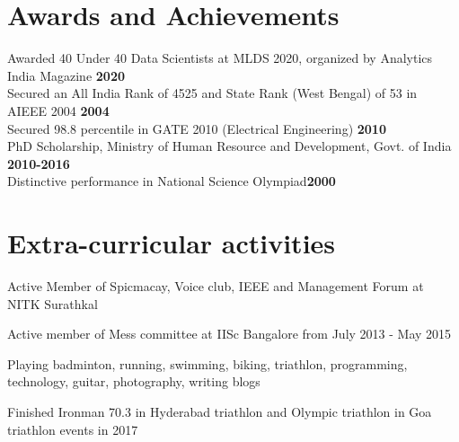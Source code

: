 \documentclass[line]{resume}
\begin{document}
{\begin{resume}
	\section{\mysidestyle Awards and Achievements}
	\vspace{1mm}
Awarded 40 Under 40 Data Scientists at MLDS 2020, organized by Analytics India Magazine \hfill \textbf{2020} \vspace{1mm} \\
	Secured an All India Rank of 4525 and State Rank (West Bengal) of 53 in AIEEE 2004 \hfill \textbf{2004} \vspace{1mm}\\%
	Secured  98.8 percentile in GATE 2010 (Electrical Engineering) \hfill \textbf{2010} \vspace{1mm}\\%
	PhD Scholarship, Ministry of Human Resource and Development, Govt. of India \hfill \textbf{2010-2016} \vspace{1mm}\\%
	Distinctive performance in National Science Olympiad\hfill \textbf{2000}                                      
		
	\section{\mysidestyle Extra-curricular activities}
			
			\begin{list2}
			
				\item
				
				
				Active Member of  Spicmacay, Voice club, IEEE and Management Forum
				at NITK Surathkal
				\item Active member of Mess committee at IISc Bangalore from July 2013 - May 2015
				\item
				
				Playing badminton,  running, swimming, biking, triathlon,  programming, technology, guitar,  photography, writing blogs
				
				\item Finished Ironman 70.3 in Hyderabad triathlon and Olympic triathlon in Goa triathlon events in 2017
				
				
		\end{list2}
	

\end{resume}}
\end{document}
